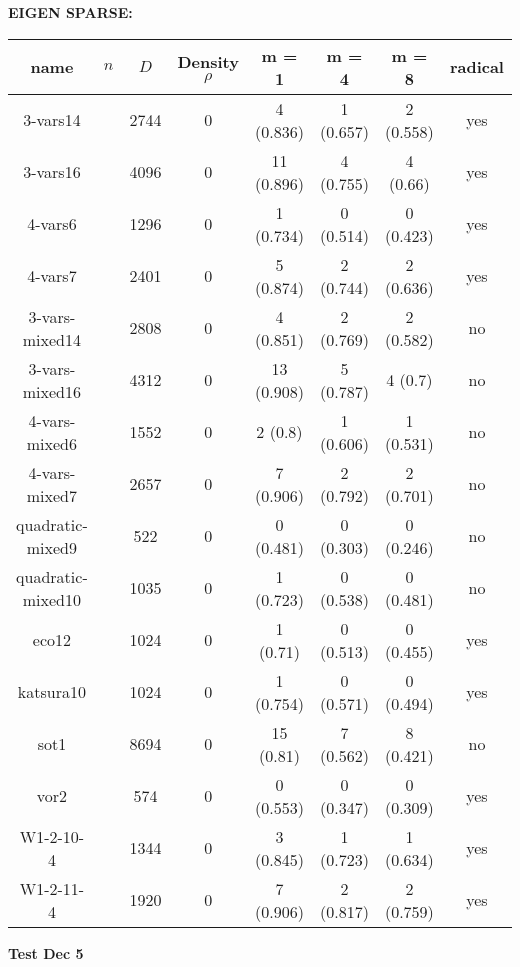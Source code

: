 \documentclass[12pt]{article}
\begin{document}
	\textbf{EIGEN SPARSE:}\\
	\begin{tabular}{c|c|c|c|c|c|c|c}
		\textbf{name}& $n$ & $D$ & \textbf{Density $\rho$} & m = 1 & m = 4 & m = 8 & \textbf{radical} \\
		\hline
		3-vars14& &2744&0&4 (0.836)&1 (0.657)&2 (0.558)&yes\\
		3-vars16& &4096&0&11 (0.896)&4 (0.755)&4 (0.66)&yes\\
		4-vars6& &1296& 0&1 (0.734)&0 (0.514)&0 (0.423)&yes\\
		4-vars7& &2401& 0&5 (0.874)&2 (0.744)&2 (0.636)&yes\\
		3-vars-mixed14& &2808&0&4 (0.851)&2 (0.769)&2 (0.582)&no\\
		3-vars-mixed16& &4312&0&13 (0.908)&5 (0.787)&4 (0.7)&no\\
		4-vars-mixed6& &1552&0&2 (0.8)&1 (0.606)&1 (0.531)&no\\
		4-vars-mixed7& &2657&0&7 (0.906)&2 (0.792)&2 (0.701)&no\\
		quadratic-mixed9& &522&0&0 (0.481)&0 (0.303)&0 (0.246)&no\\
		quadratic-mixed10& &1035&0&1 (0.723)&0 (0.538)&0 (0.481)&no\\
		eco12& &1024&0&1 (0.71)&0 (0.513)&0 (0.455)&yes\\
		katsura10& &1024&0&1 (0.754)&0 (0.571)&0 (0.494)&yes\\
		sot1& &8694&0&15 (0.81)&7 (0.562)&8 (0.421)&no\\
		vor2& &574&0&0 (0.553)&0 (0.347)&0 (0.309)&yes\\
		W1-2-10-4& &1344&0&3 (0.845)&1 (0.723)&1 (0.634)&yes\\
		W1-2-11-4& &1920&0&7 (0.906)&2 (0.817)&2 (0.759)&yes\\
	\end{tabular}
	\textbf{Test Dec 5}\\
\end{document}
